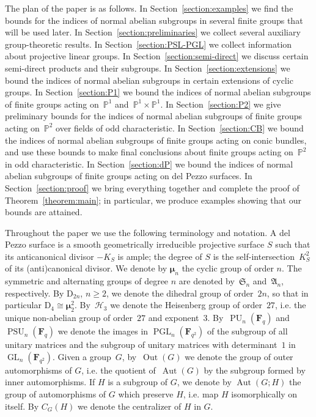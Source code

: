 \documentclass[12pt]{amsart}
\numberwithin{equation}{section}
\theoremstyle{definition}
\newcommand{\mumu}{\boldsymbol{\mu}}
\newcommand{\PP}{\mathbb P}
\newcommand{\DD}{\mathrm D}
\newcommand{\HHH}{\mathscr{H}}
\DeclareMathOperator{\Aut}{Aut}
\DeclareMathOperator{\Out}{Out}
\DeclareMathOperator{\GL}{GL}
\DeclareMathOperator{\PGL}{PGL}
\DeclareMathOperator{\PU}{PU}
\DeclareMathOperator{\PSU}{PSU}
\def \ge {\geqslant}
\begin{document}
The plan of the paper is as follows.
In Section~\ref{section:examples}
we find the bounds for the indices of normal abelian
subgroups in several finite groups that will be used later.
In Section~\ref{section:preliminaries}
we collect several auxiliary group-theoretic results.
In Section~\ref{section:PSL-PGL}
we collect information about projective linear groups.
In Section~\ref{section:semi-direct}
we discuss certain semi-direct products
and their subgroups. In Section~\ref{section:extensions}
we bound the indices of normal abelian subgroups in certain extensions of cyclic groups.
In Section~\ref{section:P1}
we bound the indices of normal abelian subgroups of finite
groups acting on~$\PP^1$ and~$\PP^1\times\PP^1$.
In Section~\ref{section:P2}
we give preliminary bounds for the indices of normal abelian subgroups of finite
groups acting on~$\PP^2$
over fields of odd characteristic.
In Section~\ref{section:CB}
we bound the indices of normal abelian subgroups of finite
groups acting on conic bundles, and use these bounds to make final conclusions
about finite groups acting on~$\PP^2$ in odd characteristic.
In Section~\ref{section:dP}
we bound the indices of normal abelian subgroups of finite
groups acting on del Pezzo surfaces.
In Section~\ref{section:proof}
we bring everything together and
complete the proof of Theorem~\ref{theorem:main}; in particular, we produce examples
showing that our bounds are attained.


Throughout the paper we use the following terminology and notation.
A del Pezzo surface is a smooth geometrically irreducible projective
surface $S$ such that its anticanonical divisor $-K_S$ is ample; the degree of $S$
is the self-intersection~$K_S^2$ of its (anti)canonical divisor.
We denote by $\mumu_n$ the cyclic group of order $n$.
The symmetric and alternating groups of degree $n$ are denoted by~$\mathfrak{S}_n$
and~$\mathfrak{A}_n$, respectively.
By $\DD_{2n}$, $n\ge 2$, we denote the dihedral group of order~$2n$,
so that in particular $\DD_4\cong\mumu_2^2$.
By~$\HHH_3$ we denote the Heisenberg group of order~$27$,
i.e. the unique non-abelian group of order~$27$ and exponent~$3$.
By~$\PU_n(\mathbf{F}_q)$ and $\PSU_n(\mathbf{F}_q)$ we denote the images in $\PGL_n(\mathbf{F}_{q^2})$ of the subgroup of all unitary matrices and the subgroup of unitary matrices with determinant~$1$
in~\mbox{$\GL_n(\mathbf{F}_{q^2})$}.
Given a group~$G$, by~$\Out(G)$ we denote the group of outer automorphisms
of $G$, i.e. the quotient of~$\Aut(G)$ by the subgroup formed by inner automorphisms.
If $H$ is a subgroup of $G$, we denote by $\Aut(G;H)$ the group of automorphisms
of $G$ which preserve $H$, i.e. map $H$ isomorphically on itself.
By $C_G(H)$ we denote the centralizer of $H$ in $G$.
\end{document}
